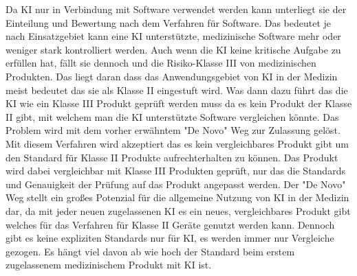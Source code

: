 Da KI nur in Verbindung mit Software verwendet werden kann unterliegt sie der Einteilung und Bewertung nach dem Verfahren für Software. Das bedeutet je nach Einsatzgebiet kann eine KI unterstützte, medizinische Software mehr oder weniger stark kontrolliert werden. Auch wenn die KI keine kritische Aufgabe zu erfüllen hat, fällt sie dennoch und die Risiko-Klasse III von medizinischen Produkten. Das liegt daran dass das Anwendungsgebiet von KI in der Medizin meist bedeutet das sie als Klasse II eingestuft wird. Was dann dazu führt das die KI wie ein Klasse III Produkt geprüft werden muss da es kein Produkt der Klasse II gibt, mit welchem man die KI unterstützte Software vergleichen könnte. Das Problem wird mit dem vorher erwähntem "De Novo" Weg zur Zulassung gelöst. Mit diesem Verfahren wird akzeptiert das es kein vergleichbares Produkt gibt um den Standard für Klasse II Produkte aufrechterhalten zu können. Das Produkt wird dabei vergleichbar mit Klasse III Produkten geprüft, nur das die Standards und Genauigkeit der Prüfung auf das Produkt angepasst werden. Der "De Novo" Weg stellt ein großes Potenzial für die allgemeine Nutzung von KI in der Medizin dar, da mit jeder neuen zugelassenen KI es ein neues, vergleichbares Produkt gibt welches für das Verfahren für Klasse II Geräte genutzt werden kann. Dennoch gibt es keine expliziten Standards nur für KI, es werden immer nur Vergleiche gezogen. Es hängt viel davon ab wie hoch der Standard beim erstem zugelassenem medizinischem Produkt mit KI ist. \cite{YAEGER2019192}